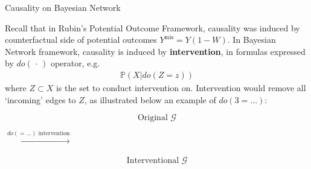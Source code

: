 \begin{point}
    Causality on Bayesian Network
\end{point}

Recall that in Rubin's Potential Outcome Framework, causality was induced by counterfactual side of potential outcomes $ Y^\mathrm{mis} = Y(1-W)  $. In Bayesian Network framework, causality is induced by \textbf{intervention}, in formulas expressed by $ do(\, \cdot \, ) $ operator, e.g.
\begin{align}
    \mathbb{P}\left( X |do(Z=z) \right)  
\end{align}
where $ Z\subset X  $ is the set to conduct intervention on. Intervention would remove all `incoming' edges to $ Z $, as illustrated below an example of $ do(3=...) $:

\begin{center}
    \begin{minipage}{0.23\linewidth}
        \begin{figure}[H]
        \centering            
        $$ \text{Original }\mathcal{G} $$       
        \end{figure}
    \end{minipage}\quad $ \xrightarrow[]{do(=...)\text{ intervention}}  $
    \begin{minipage}{0.23\linewidth}
        \begin{figure}[H]
        \centering            
        $$ \text{Interventional }\mathcal{G} $$       
        \end{figure}
    \end{minipage}
\end{center}

